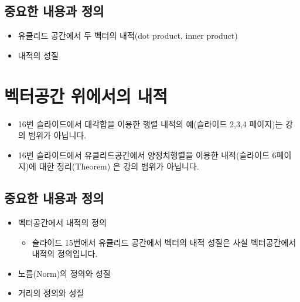 \documentclass[
  11pt,
  a4paper,
  oneside]{scrbook}
\providecommand{\tightlist}{%
  \setlength{\itemsep}{0pt}\setlength{\parskip}{0pt}}\usepackage{longtable,booktabs,array}
\theoremstyle{definition}
\theoremstyle{definition}
\theoremstyle{plain}
\theoremstyle{remark}
\begin{document}
\section{중요한 내용과
정의}\label{uxc911uxc694uxd55c-uxb0b4uxc6a9uxacfc-uxc815uxc758-6}

\begin{itemize}
\tightlist
\item
  유클리드 공간에서 두 벡터의 내적(dot product, inner product)
\item
  내적의 성질
\end{itemize}


\chapter{벡터공간 위에서의 내적}\label{inner_product_2}

\begin{tcolorbox}[enhanced jigsaw, colback=white, colframe=quarto-callout-note-color-frame, opacityback=0, toprule=.15mm, leftrule=.75mm, titlerule=0mm, opacitybacktitle=0.6, title=\textcolor{quarto-callout-note-color}{\faInfo}\hspace{0.5em}{노트}, colbacktitle=quarto-callout-note-color!10!white, breakable, bottomrule=.15mm, bottomtitle=1mm, toptitle=1mm, arc=.35mm, left=2mm, rightrule=.15mm, coltitle=black]

\begin{itemize}
\tightlist
\item
  16번 슬라이드에서 대각합을 이용한 행렬 내적의 예(슬라이드 2,3,4
  페이지)는 강의 범위가 아닙니다.
\item
  16번 슬라이드에서 유클리드공간에서 양정치행렬을 이용한 내적(슬라이드
  6페이지)에 대한 정리(Theorem) 은 강의 범위가 아닙니다.
\end{itemize}

\end{tcolorbox}

\section{중요한 내용과
정의}\label{uxc911uxc694uxd55c-uxb0b4uxc6a9uxacfc-uxc815uxc758-7}

\begin{itemize}
\tightlist
\item
  벡터공간에서 내적의 정의

  \begin{itemize}
  \tightlist
  \item
    슬라이드 15번에서 유클리드 공간에서 벡터의 내적 성질은 사실
    벡터공간에서 내적의 정의입니다.
  \end{itemize}
\item
  노름(Norm)의 정의와 성질
\item
  거리의 정의와 성질
\end{itemize}
\end{document}
